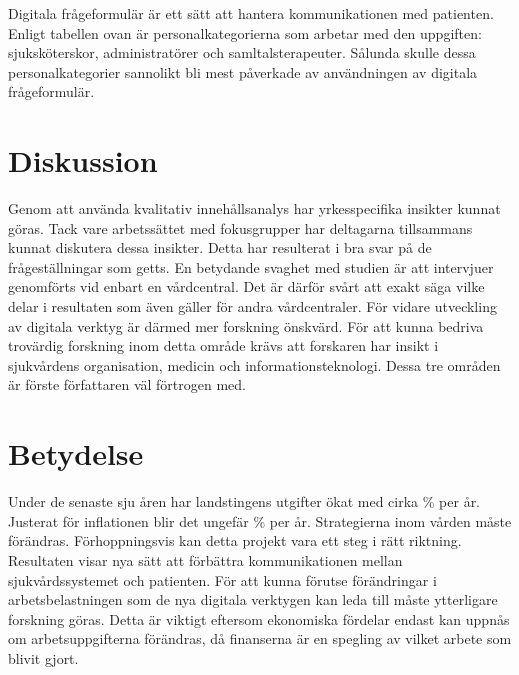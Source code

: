 \documentclass[12pt,a4paper,oneside]{article}
\let\oldcite\cite
\renewcommand*\cite[1]{\textsuperscript{\oldcite{#1}}}
\begin{document}
\newpage
Digitala fr{\aa}geformul{\"a}r {\"a}r ett s{\"a}tt att hantera kommunikationen med patienten. Enligt tabellen ovan {\"a}r personalkategorierna som arbetar med den uppgiften: sjuksk{\"o}terskor, administrat{\"o}rer och samltalsterapeuter. S{\aa}lunda skulle dessa personalkategorier sannolikt bli mest p{\aa}verkade av anv{\"a}ndningen av digitala fr{\aa}geformul{\"a}r.

\section*{Diskussion}
Genom att anv{\"a}nda kvalitativ inneh{\aa}llsanalys har yrkesspecifika insikter kunnat g{\"o}ras. Tack vare arbetss{\"a}ttet med fokusgrupper har deltagarna tillsammans kunnat diskutera dessa insikter. Detta har resulterat i bra svar p{\aa} de fr{\aa}gest{\"a}llningar som getts. En betydande svaghet med studien {\"a}r att intervjuer genomf{\"o}rts vid enbart en v{\aa}rdcentral. Det {\"a}r d{\"a}rf{\"o}r sv{\aa}rt att exakt s{\"a}ga vilke delar i resultaten som {\"a}ven g{\"a}ller f{\"o}r andra v{\aa}rdcentraler. F{\"o}r vidare utveckling av digitala verktyg {\"a}r d{\"a}rmed mer forskning {\"o}nskv{\"a}rd. F{\"o}r att kunna bedriva trov{\"a}rdig forskning inom detta omr{\aa}de kr{\"a}vs att forskaren har insikt i sjukv{\aa}rdens organisation, medicin och informationsteknologi. Dessa tre omr{\aa}den {\"a}r f{\"o}rste f{\"o}rfattaren v{\"a}l f{\"o}rtrogen med.

\section*{Betydelse}
Under de senaste sju {\aa}ren har landstingens utgifter {\"o}kat med cirka {}\% per {\aa}r. Justerat f{\"o}r inflationen blir det ungef{\"a}r {}\% per {\aa}r\cite{numbers3.1, numbers3.2}. Strategierna inom v{\aa}rden m{\aa}ste f{\"o}r{\"a}ndras. F{\"o}rhoppningsvis kan detta projekt vara ett steg i r{\"a}tt riktning. Resultaten visar nya s{\"a}tt att f{\"o}rb{\"a}ttra kommunikationen mellan sjukv{\aa}rdssystemet och patienten.
F{\"o}r att kunna f{\"o}rutse f{\"o}r{\"a}ndringar i arbetsbelastningen som de nya digitala verktygen kan leda till m{\aa}ste ytterligare forskning g{\"o}ras.  Detta {\"a}r viktigt eftersom ekonomiska f{\"o}rdelar endast kan uppn{\aa}s om arbetsuppgifterna f{\"o}r{\"a}ndras, d{\aa} finanserna {\"a}r en spegling av vilket arbete som blivit gjort.
\end{document}
